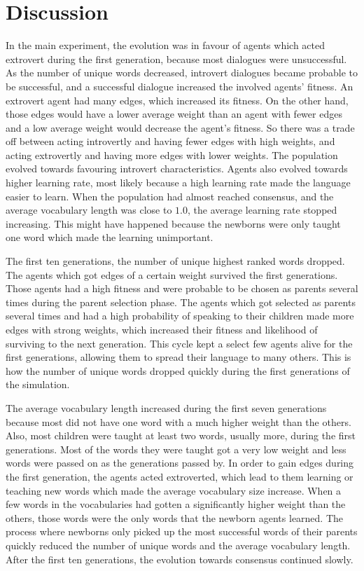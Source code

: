 \acresetall
\chapter{Discussion}
In the main experiment, the evolution was in favour of agents which acted extrovert during the first generation, because most dialogues were unsuccessful. As the number of unique words decreased, introvert dialogues became probable to be successful, and a successful dialogue increased the involved agents' fitness. An extrovert agent had many edges, which increased its fitness. On the other hand, those edges would have a lower average weight than an agent with fewer edges and a low average weight would decrease the agent's fitness. So there was a trade off between acting introvertly and having fewer edges with high weights, and acting extrovertly and having more edges with lower weights. The population evolved towards favouring introvert characteristics. Agents also evolved towards higher learning rate, most likely because a high learning rate made the language easier to learn. When the population had almost reached consensus, and the average vocabulary length was close to $1.0$, the average learning rate stopped increasing. This might have happened because the newborns were only taught one word which made the learning unimportant. 
 
The first ten generations, the number of unique highest ranked words dropped. The agents which got edges of a certain weight survived the first generations. Those agents had a high fitness and were probable to be chosen as parents several times during the parent selection phase. The agents which got selected as parents several times and had a high probability of speaking to their children made more edges with strong weights, which increased their fitness and likelihood of surviving to the next generation. This cycle kept a select few agents alive for the first generations, allowing them to spread their language to many others. This is how the number of unique words dropped quickly during the first generations of the simulation. 

The average vocabulary length increased during the first seven generations because most did not have one word with a much higher weight than the others. Also, most children were taught at least two words, usually more, during the first generations. Most of the words they were taught got a very low weight and less words were passed on as the generations passed by. In order to gain edges during the first generation, the agents acted extroverted, which lead to them learning or teaching new words which made the average vocabulary size increase. When a few words in the vocabularies had gotten a significantly higher weight than the others, those words were the only words that the newborn agents learned. The process where newborns only picked up the most successful words of their parents quickly reduced the number of unique words and the average vocabulary length. After the first ten generations, the evolution towards consensus continued slowly. 
 
